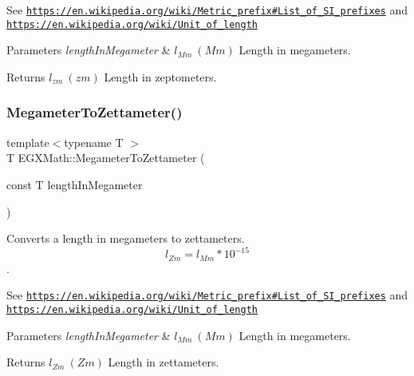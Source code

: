 See \href{https://en.wikipedia.org/wiki/Metric_prefix#List_of_SI_prefixes}{\tt https\+://en.\+wikipedia.\+org/wiki/\+Metric\+\_\+prefix\#\+List\+\_\+of\+\_\+\+S\+I\+\_\+prefixes} and \href{https://en.wikipedia.org/wiki/Unit_of_length}{\tt https\+://en.\+wikipedia.\+org/wiki/\+Unit\+\_\+of\+\_\+length} 
\begin{DoxyParams}{Parameters}
{\em length\+In\+Megameter} & $ l_{Mm}\ (Mm)$ Length in megameters. \\
\hline
\end{DoxyParams}
\begin{DoxyReturn}{Returns}
$ l_{zm}\ (zm)$ Length in zeptometers. 
\end{DoxyReturn}
\mbox{\label{group___e_g_x_math-_conversions-_length_conversions-_s_i-_megameter-_s_i_ga3a8765b61b237025a1f8a72a25443cd7}} 
\subsubsection{\texorpdfstring{Megameter\+To\+Zettameter()}{MegameterToZettameter()}}
{\footnotesize\ttfamily template$<$typename T $>$ \\
T E\+G\+X\+Math\+::\+Megameter\+To\+Zettameter (\begin{DoxyParamCaption}\item[{const T}]{length\+In\+Megameter }\end{DoxyParamCaption})}



Converts a length in megameters to zettameters. \[ l_{Zm}=l_{Mm} * 10^{-15} \]. 

See \href{https://en.wikipedia.org/wiki/Metric_prefix#List_of_SI_prefixes}{\tt https\+://en.\+wikipedia.\+org/wiki/\+Metric\+\_\+prefix\#\+List\+\_\+of\+\_\+\+S\+I\+\_\+prefixes} and \href{https://en.wikipedia.org/wiki/Unit_of_length}{\tt https\+://en.\+wikipedia.\+org/wiki/\+Unit\+\_\+of\+\_\+length} 
\begin{DoxyParams}{Parameters}
{\em length\+In\+Megameter} & $ l_{Mm}\ (Mm)$ Length in megameters. \\
\hline
\end{DoxyParams}
\begin{DoxyReturn}{Returns}
$ l_{Zm}\ (Zm)$ Length in zettameters. 
\end{DoxyReturn}
